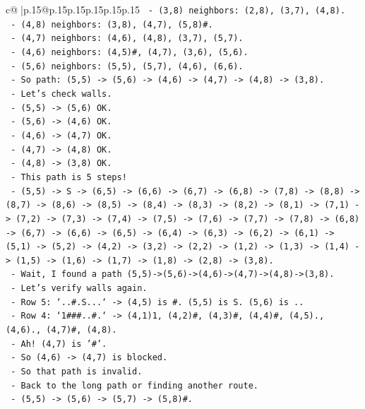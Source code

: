 \documentclass{article}
\begin{document}
{\begin{supertabular}{c@{$\;$}|p{.15\linewidth}@{}p{.15\linewidth}p{.15\linewidth}p{.15\linewidth}p{.15\linewidth}p{.15\linewidth}}
{{{\texttt{  {-} (3,8) neighbors: (2,8), (3,7), (4,8).} \\
\texttt{  {-} (4,8) neighbors: (3,8), (4,7), (5,8)\#.} \\
\texttt{  {-} (4,7) neighbors: (4,6), (4,8), (3,7), (5,7).} \\
\texttt{  {-} (4,6) neighbors: (4,5)\#, (4,7), (3,6), (5,6).} \\
\texttt{  {-} (5,6) neighbors: (5,5), (5,7), (4,6), (6,6).} \\
\texttt{  {-} So path: (5,5) {-}> (5,6) {-}> (4,6) {-}> (4,7) {-}> (4,8) {-}> (3,8).} \\
\texttt{  {-} Let's check walls.} \\
\texttt{  {-} (5,5) {-}> (5,6) OK.} \\
\texttt{  {-} (5,6) {-}> (4,6) OK.} \\
\texttt{  {-} (4,6) {-}> (4,7) OK.} \\
\texttt{  {-} (4,7) {-}> (4,8) OK.} \\
\texttt{  {-} (4,8) {-}> (3,8) OK.} \\
\texttt{  {-} This path is 5 steps!} \\
\texttt{  {-} (5,5) {-}> S {-}> (6,5) {-}> (6,6) {-}> (6,7) {-}> (6,8) {-}> (7,8) {-}> (8,8) {-}> (8,7) {-}> (8,6) {-}> (8,5) {-}> (8,4) {-}> (8,3) {-}> (8,2) {-}> (8,1) {-}> (7,1) {-}> (7,2) {-}> (7,3) {-}> (7,4) {-}> (7,5) {-}> (7,6) {-}> (7,7) {-}> (7,8) {-}> (6,8) {-}> (6,7) {-}> (6,6) {-}> (6,5) {-}> (6,4) {-}> (6,3) {-}> (6,2) {-}> (6,1) {-}> (5,1) {-}> (5,2) {-}> (4,2) {-}> (3,2) {-}> (2,2) {-}> (1,2) {-}> (1,3) {-}> (1,4) {-}> (1,5) {-}> (1,6) {-}> (1,7) {-}> (1,8) {-}> (2,8) {-}> (3,8).} \\
\texttt{  {-} Wait, I found a path (5,5){-}>(5,6){-}>(4,6){-}>(4,7){-}>(4,8){-}>(3,8).} \\
\texttt{  {-} Let's verify walls again.} \\
\texttt{  {-} Row 5: `..\#.S...` {-}> (4,5) is \#. (5,5) is S. (5,6) is ..} \\
\texttt{  {-} Row 4: `1\#\#\#..\#.` {-}> (4,1)1, (4,2)\#, (4,3)\#, (4,4)\#, (4,5)., (4,6)., (4,7)\#, (4,8).} \\
\texttt{  {-} Ah! (4,7) is '\#'.} \\
\texttt{  {-} So (4,6) {-}> (4,7) is blocked.} \\
\texttt{  {-} So that path is invalid.} \\
\texttt{  {-} Back to the long path or finding another route.} \\
\texttt{  {-} (5,5) {-}> (5,6) {-}> (5,7) {-}> (5,8)\#.} \\
}}}
\end{supertabular}}
\end{document}
